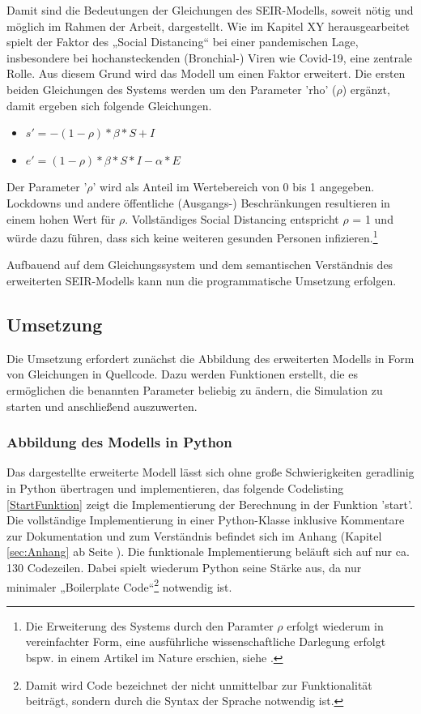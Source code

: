 \documentclass[12pt]{article}
\begin{document}
Damit sind die Bedeutungen der Gleichungen des SEIR-Modells, soweit nötig und möglich im Rahmen der Arbeit, dargestellt. Wie im Kapitel XY herausgearbeitet spielt der Faktor des „Social Distancing“ bei einer pandemischen Lage, insbesondere bei hochansteckenden (Bronchial-) Viren wie Covid-19, eine zentrale Rolle. Aus diesem Grund wird das Modell um einen Faktor erweitert. Die ersten beiden Gleichungen des Systems werden um den Parameter 'rho' ($\rho$) ergänzt, damit ergeben sich folgende Gleichungen.

\begin{itemize}
    \item $s' = -(1-\rho)*\beta*S+I$
    \item $e' = (1-\rho)*\beta*S*I-\alpha*E$
\end{itemize}

Der Parameter '$\rho$' wird als Anteil im Wertebereich von 0 bis 1 angegeben. Lockdowns und andere öffentliche (Ausgangs-) Beschränkungen resultieren in einem hohen Wert für $\rho$. Vollständiges Social Distancing entspricht $\rho$ = 1 und würde dazu führen, dass sich keine weiteren gesunden Personen infizieren.\footnote{Die Erweiterung des Systems durch den Paramter $\rho$ erfolgt wiederum in vereinfachter Form, eine ausführliche wissenschaftliche Darlegung erfolgt bspw. in einem Artikel im Nature erschien, siehe \cite{EffectSocDist}.}

Aufbauend auf dem Gleichungssystem und dem semantischen Verständnis des erweiterten SEIR-Modells kann nun die programmatische Umsetzung erfolgen.

\subsection{Umsetzung}
Die Umsetzung erfordert zunächst die Abbildung des erweiterten Modells in Form von Gleichungen in Quellcode. Dazu werden Funktionen erstellt, die es ermöglichen die benannten Parameter beliebig zu ändern, die Simulation zu starten und anschließend auszuwerten.

\subsubsection{Abbildung des Modells in Python}
Das dargestellte erweiterte Modell lässt sich ohne große Schwierigkeiten geradlinig in Python übertragen und implementieren, das folgende Codelisting \ref{StartFunktion} zeigt die Implementierung der Berechnung in der Funktion 'start'. Die vollständige Implementierung in einer Python-Klasse inklusive Kommentare zur Dokumentation und zum Verständnis befindet sich im Anhang (Kapitel \ref{sec:Anhang} ab Seite \pageref{sec:Anhang}). Die funktionale Implementierung beläuft sich auf nur ca. 130 Codezeilen. Dabei spielt wiederum Python seine Stärke aus, da nur minimaler „Boilerplate Code“\footnote{Damit wird Code bezeichnet der nicht unmittelbar zur Funktionalität beiträgt, sondern durch die Syntax der Sprache notwendig ist.} notwendig ist.
\end{document}
